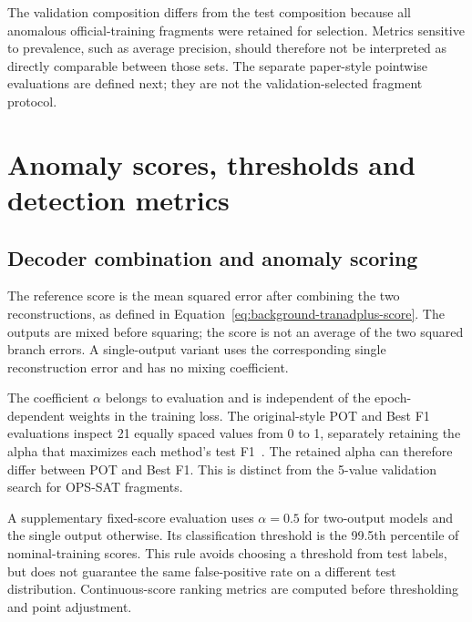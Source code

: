 The validation composition differs from the test composition because all
anomalous official-training fragments were retained for selection. Metrics
sensitive to prevalence, such as average precision, should therefore not
be interpreted as directly comparable between those sets. The separate
paper-style pointwise evaluations are defined next; they are not the
validation-selected fragment protocol.

\section{Anomaly scores, thresholds and detection metrics}
\label{sec:datasets-metrics}
\subsection{Decoder combination and anomaly scoring}
\label{sec:datasets-scoring}
The reference score is the mean squared error after combining the two
reconstructions, as defined in Equation~\eqref{eq:background-tranadplus-score}.
The outputs are mixed before squaring; the score is not an average of the
two squared branch errors. A single-output variant uses the corresponding
single reconstruction error and has no mixing coefficient.

The coefficient \(\alpha\) belongs to evaluation and is independent of
the epoch-dependent weights in the training loss. The original-style
POT and Best F1 evaluations inspect \num{21} equally spaced values from
\num{0} to \num{1}, separately retaining the alpha that maximizes each
method's test F1~\cite{TranADPlusReferenceCode}. The retained alpha can
therefore differ between POT and Best F1. This is distinct from the
\num{5}-value validation search for \ac{OPS-SAT} fragments.

A supplementary fixed-score evaluation uses \(\alpha=0.5\) for two-output
models and the single output otherwise. Its classification threshold is
the \num{99.5}th percentile of nominal-training scores. This rule avoids
choosing a threshold from test labels, but does not guarantee the same
false-positive rate on a different test distribution. Continuous-score
ranking metrics are computed before thresholding and point adjustment.

